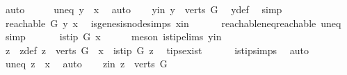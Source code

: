 \begin{isabellebody}
\ auto\isanewline
\ \ \isamarkupfalse%
\ \isamarkupfalse%
\ uneq{\isacharcolon}{\kern0pt}\ {\isachardoublequoteopen}y\ {\isasymnoteq}\ x{\isachardoublequoteclose}\ \isamarkupfalse%
\ auto\isanewline
\ \ \isamarkupfalse%
\ y{\isacharunderscore}{\kern0pt}in{\isacharcolon}{\kern0pt}\ {\isachardoublequoteopen}y\ {\isasymin}\ {\isacharparenleft}{\kern0pt}verts\ G{\isacharparenright}{\kern0pt}{\isachardoublequoteclose}\ \isamarkupfalse%
\ y{\isacharunderscore}{\kern0pt}def\ \isamarkupfalse%
\ simp\isanewline
\ \ \isamarkupfalse%
\ \isamarkupfalse%
\ {\isachardoublequoteopen}reachable{}\ G\ y\ x{\isachardoublequoteclose}\ \isamarkupfalse%
\ is{\isacharunderscore}{\kern0pt}genesis{\isacharunderscore}{\kern0pt}node{\isachardot}{\kern0pt}simps\ x{\isacharunderscore}{\kern0pt}in\isanewline
\ \ \ \ \ \ reachable{\isacharunderscore}{\kern0pt}neq{\isacharunderscore}{\kern0pt}reachable{}\ uneq\ \isamarkupfalse%
\ simp\isanewline
\ \ \isamarkupfalse%
\ \isamarkupfalse%
\ {\isachardoublequoteopen}{\isasymnot}\ is{\isacharunderscore}{\kern0pt}tip\ G\ x{\isachardoublequoteclose}\isanewline
\ \ \ \ \isamarkupfalse%
\ {\isacharparenleft}{\kern0pt}meson\ is{\isacharunderscore}{\kern0pt}tip{\isachardot}{\kern0pt}elims{\isacharparenleft}{\kern0pt}{}{\isacharparenright}{\kern0pt}\ y{\isacharunderscore}{\kern0pt}in{\isacharparenright}{\kern0pt}\ \isanewline
\ \ \isamarkupfalse%
\ \isamarkupfalse%
\ z\ \ z{\isacharunderscore}{\kern0pt}def{\isacharcolon}{\kern0pt}\ {\isachardoublequoteopen}z\ {\isasymin}\ {\isacharparenleft}{\kern0pt}verts\ G{\isacharparenright}{\kern0pt}\ {\isacharminus}{\kern0pt}\ {\isacharbraceleft}{\kern0pt}x{\isacharbraceright}{\kern0pt}\ {\isasymand}\ is{\isacharunderscore}{\kern0pt}tip\ G\ z{\isachardoublequoteclose}\ \isamarkupfalse%
\ tips{\isacharunderscore}{\kern0pt}exist\isanewline
\ \ \ \ \ \ is{\isacharunderscore}{\kern0pt}tip{\isachardot}{\kern0pt}simps\ \isamarkupfalse%
\ auto\isanewline
\ \ \isamarkupfalse%
\ \isamarkupfalse%
\ uneq{\isacharcolon}{\kern0pt}\ {\isachardoublequoteopen}z\ {\isasymnoteq}\ x{\isachardoublequoteclose}\ \isamarkupfalse%
\ auto\isanewline
\ \ \isamarkupfalse%
\ z{\isacharunderscore}{\kern0pt}in{\isacharcolon}{\kern0pt}\ {\isachardoublequoteopen}z\ {\isasymin}\ verts\ G{\isachardoublequoteclose}\ \isamarkupfalse%

\end{isabellebody}
